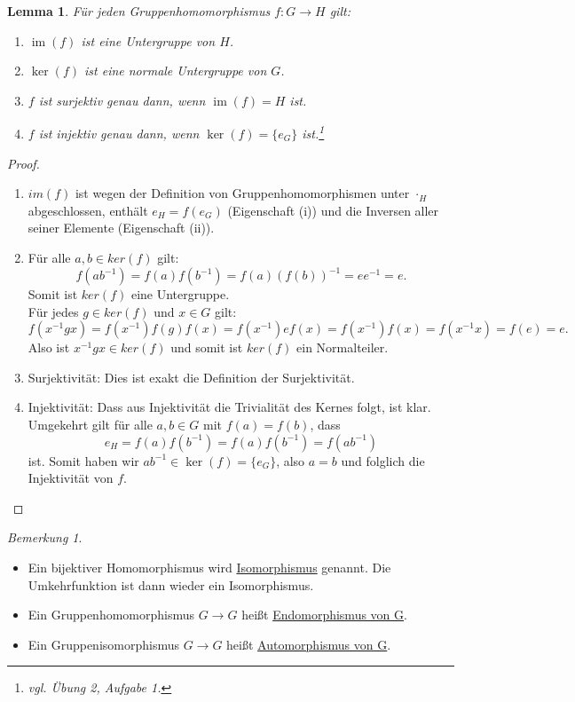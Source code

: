\documentclass[12pt]{scrartcl}%
\newtheorem{lemma}{Lemma}
\theoremstyle{definition}
\theoremstyle{remark}
\newtheorem*{nb}{Bemerkung}
\DeclareMathOperator\im{im}
\begin{document}
\begin{lemma}
	Für jeden Gruppenhomomorphismus $ f: G \rightarrow H$ gilt:
	\begin{enumerate}[label=(\roman*)]
		\item $\im(f)$ ist eine Untergruppe von $H$.
		\item $\ker(f)$ ist eine normale Untergruppe von $G$.
		\item $f$ ist surjektiv genau dann, wenn $\im(f) = H$ ist.
		\item $f$ ist injektiv genau dann, wenn $\ker(f) = \{e_G\}$ ist.\footnote{vgl. Übung 2, Aufgabe 1.}
	\end{enumerate}
\end{lemma}

\begin{proof}
	\begin{enumerate}[label=(\roman*)]
		\item $im(f)$ ist wegen der Definition von Gruppenhomomorphismen unter $\cdot_H$ abgeschlossen, enthält $e_H = f(e_G)$ (Eigenschaft (i)) und die Inversen aller seiner Elemente (Eigenschaft (ii)).
		\item Für alle $a, b \in ker(f)$ gilt:
			$$ f(ab^{-1}) = f(a)f(b^{-1}) = f(a)(f(b))^{-1} = ee^{-1} = e.$$
			Somit ist $ker(f)$ eine Untergruppe. \\
			Für jedes $ g \in ker(f)$ und $x \in G$ gilt:
			$$ f(x^{-1}gx) = f(x^{-1})f(g)f(x) = f(x^{-1}) e f(x) = f(x^{-1})f(x) = f(x^{-1}x) = f(e) = e.$$
			Also ist $x^{-1}gx \in ker(f) $ und somit ist $ker(f)$ ein Normalteiler.
		\item Surjektivität: Dies ist exakt die Definition der Surjektivität.
		\item Injektivität: Dass aus Injektivität die Trivialität des Kernes folgt, ist klar.
			Umgekehrt gilt für alle \(a, b \in G\) mit \(f(a) = f(b)\), dass \[e_H = f(a)f(b^{-1}) =f(a)f(b^{-1}) = f(ab^{-1})\] ist.
			Somit haben wir \(ab^{-1} \in \ker(f) = \{e_G\}\), also \(a = b\) und folglich die Injektivität von \(f\). \qedhere
	\end{enumerate}	
\end{proof}

\begin{nb}
	\begin{itemize}
		\item Ein bijektiver Homomorphismus wird \underline{Isomorphismus} genannt. Die Umkehrfunktion ist dann wieder ein Isomorphismus.
		\item Ein Gruppenhomomorphismus $G \rightarrow G$ heißt \underline{Endomorphismus von G}.
		\item Ein Gruppenisomorphismus $G \rightarrow G$ heißt \underline{Automorphismus von G}.
	\end{itemize}
\end{nb}
\end{document}

